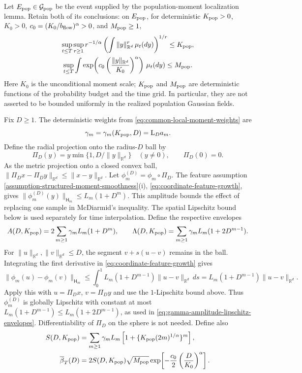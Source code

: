 Let $E_{\rm pop}\in\mathcal G_{\rm pop}$ be the event supplied by
the population-moment localization lemma.  Retain both of its conclusions:
on $E_{\rm pop}$, for deterministic $K_{\rm pop}>0$, $K_0>0$,
$c_0=(K_0/b_{\rm flow})^\alpha>0$, and $M_{\rm pop}\ge1$,
\begin{equation}
\label{eq:gamma-population-localization-input}
\begin{gathered}
 \sup_{t\le T}\sup_{r\ge1}r^{-1/\alpha}
 \left(\int\|y\|_{\mathbb R^d}^r\,\mu_t(dy)\right)^{1/r}\le K_{\rm pop},
 \\
 \sup_{t\le T}\int
 \exp\!\left(c_0\left(\frac{\|y\|_{\mathbb R^d}}{K_0}\right)^\alpha\right)
 \,\mu_t(dy)\le M_{\rm pop}.
\end{gathered}
\end{equation}
Here $K_0$ is the unconditional moment scale; $K_{\rm pop}$ and
$M_{\rm pop}$ are deterministic functions of the probability budget and
the time grid.  In particular, they are not asserted to be bounded
uniformly in the realized population Gaussian fields.

Fix $D\ge1$. The deterministic weights from
\cref{eq:common-local-moment-weights} are
\[
 \gamma_m=\gamma_m(K_{\rm pop},D)=\mathrm L_Da_m.
\]
Define the radial projection onto the radius-$D$ ball by
\[
\Pi_D(y)=y\min\{1,D/\|y\|_{\mathbb R^d}\}\quad(y\ne0),\qquad \Pi_D(0)=0.
\]
As the metric projection onto a closed convex ball,
$\|\Pi_Dx-\Pi_Dy\|_{\mathbb R^d}\le\|x-y\|_{\mathbb R^d}$.
Let $\phi_m^{(D)}=\phi_m\circ\Pi_D$. The feature assumption
\cref{assumption-structured-moment-smoothness}(i),
\eqref{eq:coordinate-feature-growth}, gives
$\|\phi_m^{(D)}(y)\|_{\mathsf H_m}\le L_m(1+D^m)$.
This amplitude bounds the effect of replacing one sample in McDiarmid's
inequality. The spatial Lipschitz bound below is used separately for
time interpolation. Define the respective envelopes
\begin{equation}
\label{eq:gamma-amplitude-lipschitz-envelopes}
 A(D,K_{\rm pop})=2\sum_{m\ge1}\gamma_mL_m(1+D^m),
 \qquad
 \Lambda(D,K_{\rm pop})=
 \sum_{m\ge1}\gamma_mL_m(1+2D^{m-1}).
\end{equation}
For $\|u\|_{\mathbb R^d},\|v\|_{\mathbb R^d}\le D$, the segment $v+s(u-v)$ remains in the ball.
Integrating the first derivative in \eqref{eq:coordinate-feature-growth}
gives
\[
 \|\phi_m(u)-\phi_m(v)\|_{\mathsf H_m}
 \le\int_0^1 L_m(1+D^{m-1})\|u-v\|_{\mathbb R^d}\,ds
 =L_m(1+D^{m-1})\|u-v\|_{\mathbb R^d}.
\]
Apply this with $u=\Pi_Dx$, $v=\Pi_Dy$ and use the $1$-Lipschitz
bound above. Thus $\phi_m^{(D)}$ is globally Lipschitz with constant
at most $L_m(1+D^{m-1})\le L_m(1+2D^{m-1})$, as used in
\eqref{eq:gamma-amplitude-lipschitz-envelopes}.
Differentiability of $\Pi_D$ on the sphere is not needed.
Define also
\begin{equation}
\label{eq:gamma-conditional-tail-sum}
\begin{aligned}
 S(D,K_{\rm pop})&=
 \sum_{m\ge1}\gamma_mL_m
 \left[1+\{K_{\rm pop}(2m)^{1/\alpha}\}^{m}\right],
 \\
 \overline\beta_T(D)&=
 2S(D,K_{\rm pop})\sqrt{M_{\rm pop}}
 \exp\!\left[-\frac{c_0}{2}
               \left(\frac{D}{K_0}\right)^\alpha\right].
\end{aligned}
\end{equation}

